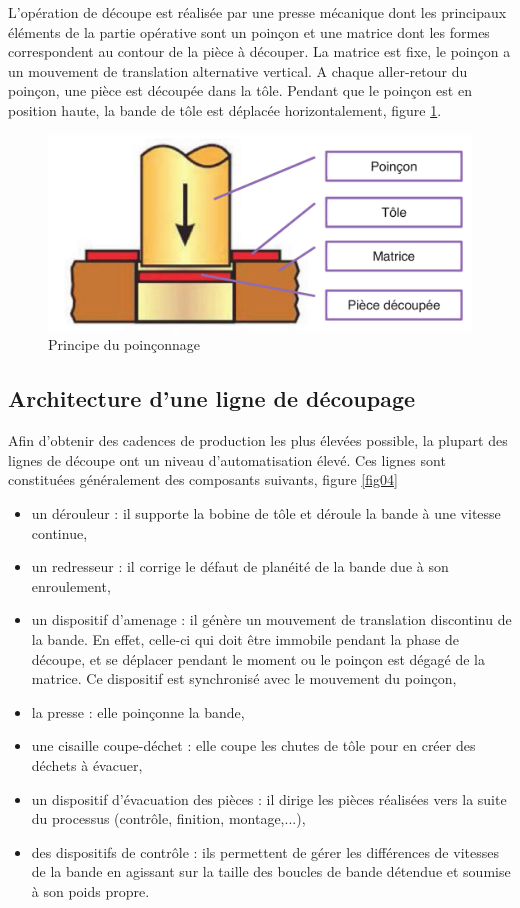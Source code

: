 L'opération de découpe est réalisée par une presse mécanique dont les principaux éléments de
la partie opérative sont un poinçon et une matrice dont les formes correspondent au contour de
la pièce à découper. La matrice est fixe, le poinçon a un mouvement de translation alternative
vertical. A chaque aller-retour du poinçon, une pièce est découpée dans la tôle. Pendant que le
poinçon est en position haute, la bande de tôle est déplacée horizontalement, figure \ref{fig03}.

\begin{figure}[!h]
 \centering\includegraphics[width=0.7\linewidth]{img/fig3}
 \caption{Principe du poinçonnage}
 \label{fig03}
\end{figure}

\newpage

\subsection{Architecture d'une ligne de découpage}

Afin d'obtenir des cadences de production les plus élevées possible, la plupart des lignes de
découpe ont un niveau d'automatisation élevé. Ces lignes sont constituées généralement des
composants suivants, figure \ref{fig04}
\begin{itemize}
 \item un dérouleur : il supporte la bobine de tôle et déroule la bande à une vitesse continue,
 \item un redresseur : il corrige le défaut de planéité de la bande due à son enroulement,
 \item un dispositif d'amenage : il génère un mouvement de translation discontinu de la bande. En
effet, celle-ci qui doit être immobile pendant la phase de découpe, et se déplacer pendant le
moment ou le poinçon est dégagé de la matrice. Ce dispositif est synchronisé avec le
mouvement du poinçon,
 \item la presse : elle poinçonne la bande,
 \item une cisaille coupe-déchet : elle coupe les chutes de tôle pour en créer des déchets à
évacuer,
 \item un dispositif d'évacuation des pièces : il dirige les pièces réalisées vers la suite du
processus (contrôle, finition, montage,...),
 \item des dispositifs de contrôle : ils permettent de gérer les différences de vitesses de la bande
en agissant sur la taille des boucles de bande détendue et soumise à son poids propre.
\end{itemize}

